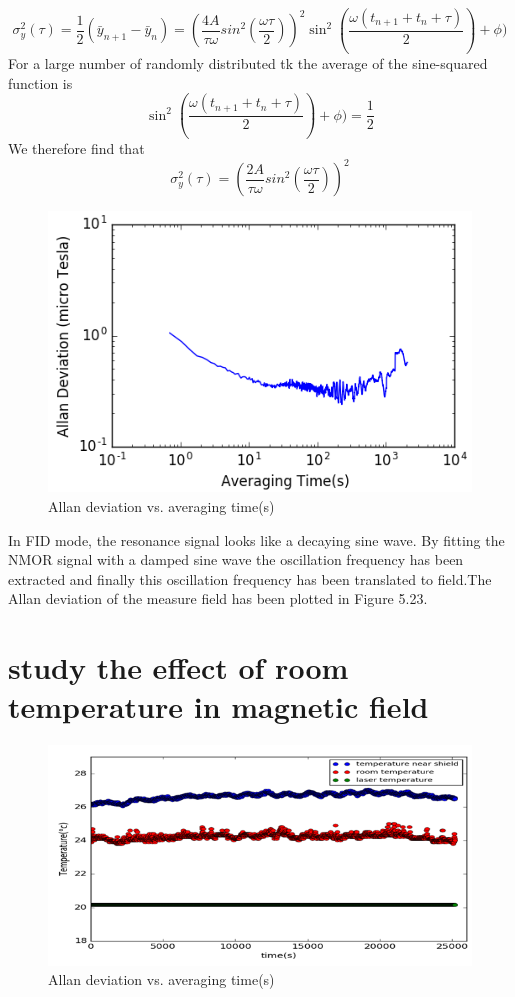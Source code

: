 \documentclass[12pt]{report}
\begin{document}
\begin{equation}
{\sigma_y^2(\tau)}=\frac{1}{2}(\bar{y}_{n+1}-\bar{y}_{n})=(\frac{4A}
{\tau \omega}sin^2(\frac{\omega \tau}{2}))^2 \sin^2     (\frac{\omega(t_{n+1} +t_{n}+\tau)}{2})+\phi)
\end{equation}
For a large number of randomly
distributed tk the average of the sine-squared function is
\begin{equation}
\sin^2    (\frac{\omega(t_{n+1} +t_{n}+\tau)}{2})+\phi)=\frac{1}{2}
\end{equation}
We therefore find that
\begin{equation}
{\sigma_y^2(\tau)}=(\frac{2A}
{\tau \omega}sin^2(\frac{\omega \tau}{2}))^2
\end{equation}
\begin{figure}[h]
\centering\includegraphics[width=0.6\linewidth]{figures/allan_plot}
\caption{Allan deviation vs. averaging time(s)}
\end{figure}
In FID mode, the resonance signal looks like a decaying sine wave. By fitting the NMOR signal with a damped sine wave the oscillation frequency has been extracted and finally this oscillation frequency has been translated to field.The Allan deviation of the measure field has been plotted in Figure 5.23.
\newpage
  \section{study the effect of room temperature in magnetic field} 
  \begin{figure}[h]
\centering\includegraphics[width=0.6\linewidth]{figures/temp}
\caption{Allan deviation vs. averaging time(s)}
\end{figure}
\newpage
\end{document}
